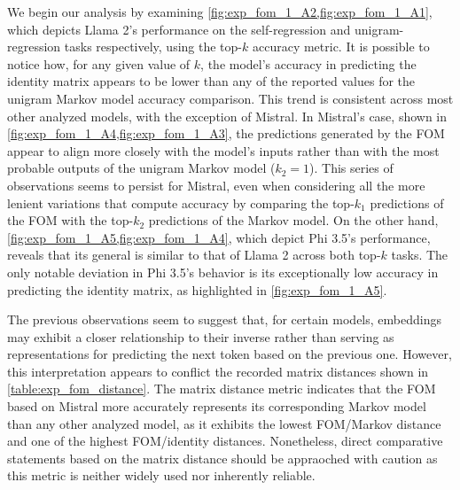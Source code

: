 We begin our analysis by examining \cref{fig:exp_fom_1_A2,fig:exp_fom_1_A1}, which depicts Llama 2's performance on the self-regression and unigram-regression tasks respectively, using the top-$k$ accuracy metric.
It is possible to notice how, for any given value of $k$, the model's accuracy in predicting the identity matrix appears to be lower than any of the reported values for the unigram Markov model accuracy comparison.
This trend is consistent across most other analyzed models, with the exception of Mistral.
In Mistral's case, shown in \cref{fig:exp_fom_1_A4,fig:exp_fom_1_A3}, the predictions generated by the FOM appear to align more closely with the model's inputs rather than with the most probable outputs of the unigram Markov model ($k_2 = 1$).
This series of observations seems to persist for Mistral, even when considering all the more lenient variations that compute accuracy by comparing the top-$k_1$ predictions of the FOM with the top-$k_2$ predictions of the Markov model.
On the other hand, \cref{fig:exp_fom_1_A5,fig:exp_fom_1_A4}, which depict Phi 3.5's performance, reveals that its general is similar to that of Llama 2 across both top-$k$ tasks.
The only notable deviation in Phi 3.5's behavior is its exceptionally low accuracy in predicting the identity matrix, as highlighted in \cref{fig:exp_fom_1_A5}.

\begin{figure}[t!]
    \centering
    \quad
    \quad
    \caption{}
    \label{fig:exp_fom_1_A}
\end{figure}

The previous observations seem to suggest that, for certain models, embeddings may exhibit a closer relationship to their inverse rather than serving as representations for predicting the next token based on the previous one. 
However, this interpretation appears to conflict the recorded matrix distances shown in \cref{table:exp_fom_distance}.
The matrix distance metric indicates that the FOM based on Mistral more accurately represents its corresponding Markov model than any other analyzed model, as it exhibits the lowest FOM/Markov distance and one of the highest FOM/identity distances.
Nonetheless, direct comparative statements based on the matrix distance should be appraoched with caution as this metric is neither widely used nor inherently reliable.

